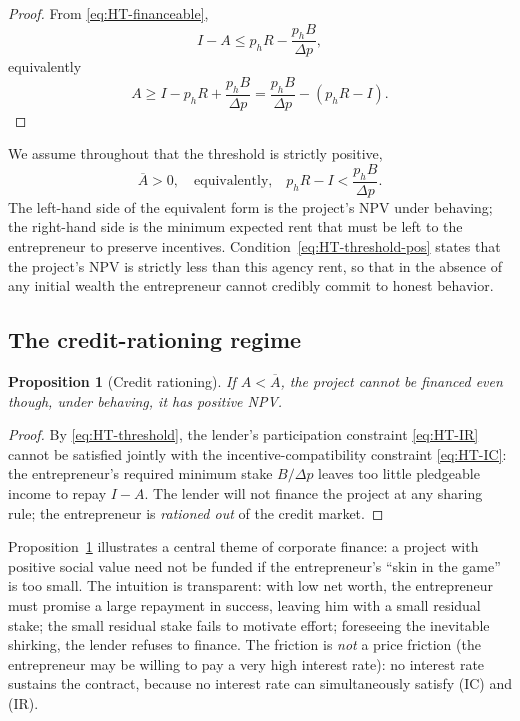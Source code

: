 \documentclass[11pt,a4paper,oneside]{book}
\def\leq{\leqslant}
\def\geq{\geqslant}
\theoremstyle{plain}
\newtheorem{proposition}[theorem]{Proposition}
\theoremstyle{definition}
\theoremstyle{remark}
\numberwithin{equation}{chapter}
\begin{document}
\begin{proof}
From \eqref{eq:HT-financeable},
\begin{equation*}
  I - A \leq p_h R - \frac{p_h B}{\Delta p},
\end{equation*}
equivalently
\begin{equation*}
  A \geq I - p_h R + \frac{p_h B}{\Delta p} = \frac{p_h B}{\Delta p} - (p_h R - I).
\end{equation*}
\end{proof}

We assume throughout that the threshold is strictly positive,
\begin{equation}\label{eq:HT-threshold-pos}
  \overline{A} > 0,
  \quad \text{equivalently,} \quad
  p_h R - I < \frac{p_h B}{\Delta p}.
\end{equation}
The left-hand side of the equivalent form is the project's NPV under behaving; the right-hand side is the minimum expected rent that must be left to the entrepreneur to preserve incentives.
Condition~\eqref{eq:HT-threshold-pos} states that the project's NPV is strictly less than this agency rent, so that in the absence of any initial wealth the entrepreneur cannot credibly commit to honest behavior.

\subsection{The credit-rationing regime}

\begin{proposition}[Credit rationing]\label{prop:HT-rationing}
If $A < \overline{A}$, the project cannot be financed even though, under behaving, it has positive NPV.
\end{proposition}

\begin{proof}
By \eqref{eq:HT-threshold}, the lender's participation constraint \eqref{eq:HT-IR} cannot be satisfied jointly with the incentive-compatibility constraint \eqref{eq:HT-IC}: the entrepreneur's required minimum stake $B/\Delta p$ leaves too little pledgeable income to repay $I - A$.
The lender will not finance the project at any sharing rule; the entrepreneur is \emph{rationed out} of the credit market.
\end{proof}

Proposition~\ref{prop:HT-rationing} illustrates a central theme of corporate finance: a project with positive social value need not be funded if the entrepreneur's ``skin in the game'' is too small.
The intuition is transparent: with low net worth, the entrepreneur must promise a large repayment in success, leaving him with a small residual stake; the small residual stake fails to motivate effort; foreseeing the inevitable shirking, the lender refuses to finance.
The friction is \emph{not} a price friction (the entrepreneur may be willing to pay a very high interest rate): no interest rate sustains the contract, because no interest rate can simultaneously satisfy (IC) and (IR).
\end{document}
